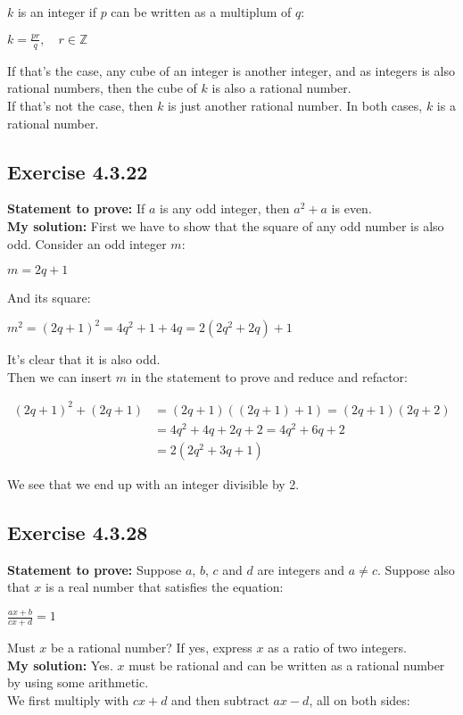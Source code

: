 \documentclass{article}
\newcommand{\cent}[1]{\begin{center}#1\end{center}}
\newcommand{\mAlign}[1]{\begin{align*}#1\end{align*}}
\newcommand{\doubleZ}{\mathbb{Z}}
\newcommand{\In}{\! \in \!}
\newcommand{\Prove}{\textbf{Statement to prove: }}
\newcommand{\Solution}{\textbf{My solution: }}
\newcommand{\QED}{\boxed{}}
\newcommand{\Exercise}[1]{\subsection*{Exercise #1}}
\begin{document}
	$k$ is an integer if $p$ can be written as a multiplum of $q$:
	
	\cent{$k = \frac{pr}{q}, \quad r \In \doubleZ$}
	
	If that's the case, any cube of an integer is another integer, and as integers is also rational numbers, then the cube of $k$ is also a rational number.\\
	
	If that's not the case, then $k$ is just another rational number. In both cases, $k$ is a rational number.\\
	\QED
	
	\Exercise{4.3.22}
	
	\Prove
	If $a$ is any odd integer, then $a^2 + a$ is even.\\
	
	\Solution
	First we have to show that the square of any odd number is also odd. Consider an odd integer $m$:
	
	\cent{$m = 2q + 1$}
	
	And its square:
	
	\cent{$m^2 = (2q+1)^2 = 4q^2+1+4q = 2(2q^2 + 2q) + 1$}
	
	It's clear that it is also odd.\\
	
	Then we can insert $m$ in the statement to prove and reduce and refactor:
	
	\mAlign{(2q+1)^2 + (2q+1) &= (2q+1)((2q+1) + 1) = (2q+1)(2q+2) \\
					&= 4q^2 +4q + 2q +2 = 4q^2 +6q + 2 \\
					&= 2(2q^2+3q + 1)}
				
	We see that we end up with an integer divisible by 2.\\
	\QED
	
	\Exercise{4.3.28}
	
	\Prove
	Suppose $a$, $b$, $c$ and $d$ are integers and $a \neq c$. Suppose also that $x$ is a real number that satisfies the equation:
	
	\cent{$\frac{ax+b}{cx+d} = 1$}
	
	Must $x$ be a rational number? If yes, express $x$ as a ratio of two integers.\\
	
	\Solution
	Yes. $x$ must be rational and can be written as a rational number by using some arithmetic.\\
	
	We first multiply with $cx+d$ and then subtract $ax - d$, all on both sides:
	 
\end{document}
